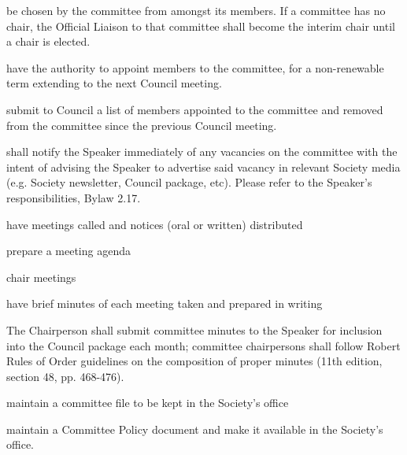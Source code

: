 \begin{longenum}[ label*=\thesubsection.\arabic*., align=left]
	\item be chosen by the committee from amongst its members. If a committee has no chair, the Official Liaison to that committee shall become the interim chair until a chair is elected.
    \item have the authority to appoint members to the committee, for a non-renewable term extending to the next Council meeting. 
    \item submit to Council a list of members appointed to the committee and removed from the committee since the previous Council meeting.
    \item shall notify the Speaker immediately of any vacancies on the committee with the intent of advising the Speaker to advertise said vacancy in relevant Society media (e.g. Society newsletter, Council package, etc). Please refer to the Speaker's responsibilities, Bylaw 2.17.
    \item have meetings called and notices (oral or written) distributed
    \item prepare a meeting agenda
    \item chair meetings
    \item have brief minutes of each meeting taken and prepared in writing
    \begin{longenum}[ label*=\arabic*., align=left]
		\item The Chairperson shall submit committee minutes to the Speaker for inclusion into the Council package each month; committee chairpersons shall follow Robert Rules of Order guidelines on the composition of proper minutes (11th edition, section 48, pp. 468-476).
	\end{longenum}
    \item maintain a committee file to be kept in the Society's office
    \item maintain a Committee Policy document and make it available in the Society's office.

\end{longenum}
